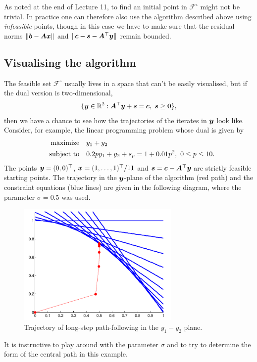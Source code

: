 \begin{remark}
 As noted at the end of Lecture 11, to find an initial point in $\mathcal{F}^{\circ}$ might not be trivial. In practice one can therefore also use the algorithm described above using {\em infeasible} points, though in this case we have to make sure that the residual norms $\Vert {\bm{b}-\bm{A}\bm{x}}\Vert$ and $\Vert {\bm{c}-\bm{s}-\bm{A}^{\top}\bm{y}}\Vert$ remain bounded.
\end{remark}

\subsection{Visualising the algorithm}
The feasible set $\mathcal{F}^{\circ}$ usually lives in a space that can't be easily visualised, but if the dual version is two-dimensional,
\begin{equation*}
 \{\bm{y}\in \mathbb{R}^2 \mathrel{\mathop{:}} \bm{A}^{\top}\bm{y}+\bm{s}=\bm{c}, \ \bm{s}\geq \bm{0}\},
\end{equation*}
then we have a chance to see how the trajectories of the iterates in $\bm{y}$ look like.
Consider, for example, the linear programming problem whose dual is given by
\begin{align*}
\text{maximize}\quad & y_1+y_2\\
\quad\text{subject to}\quad & 0.2py_1+y_2+s_p = 1+0.01p^2, \ 0\leq p\leq 10.
\end{align*}
The points $\bm{y}=(0,0)^{\top}$, $\bm{x}=(1,\dots,1)^{\top}/11$ and $\bm{s}=\bm{c}-\bm{A}^{\top}\bm{y}$ are strictly feasible starting points. The trajectory in the $\bm{y}$-plane of the algorithm (red path) and the constraint equations (blue lines) are given in the following diagram, where the parameter $\sigma=0.5$ was used.
\begin{figure}[h!]
\centering
 \includegraphics[width=0.7\textwidth]{images/lect12_cropped.pdf}
 \caption{Trajectory of long-step path-following in the $y_1-y_2$ plane.}\label{fig:fig1}
\end{figure}
It is instructive to play around with the parameter $\sigma$ and to try to determine the form of the central path in this example.

